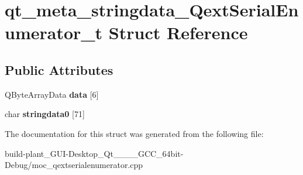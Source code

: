\hypertarget{structqt__meta__stringdata__QextSerialEnumerator__t}{}\section{qt\+\_\+meta\+\_\+stringdata\+\_\+\+Qext\+Serial\+Enumerator\+\_\+t Struct Reference}
\label{structqt__meta__stringdata__QextSerialEnumerator__t}
\subsection*{Public Attributes}
\begin{DoxyCompactItemize}
\item 
\mbox{\label{structqt__meta__stringdata__QextSerialEnumerator__t_a0c495525f0d472cd0b67572f343ff4a9}} 
Q\+Byte\+Array\+Data {\bfseries data} \mbox{[}6\mbox{]}
\item 
\mbox{\label{structqt__meta__stringdata__QextSerialEnumerator__t_a34e373d82c5f50ba7f12815a13d30f24}} 
char {\bfseries stringdata0} \mbox{[}71\mbox{]}
\end{DoxyCompactItemize}


The documentation for this struct was generated from the following file\+:\begin{DoxyCompactItemize}
\item 
build-\/plant\+\_\+\+G\+U\+I-\/\+Desktop\+\_\+\+Qt\+\_\+\_\+\_\+\_\+\+G\+C\+C\+\_\+64bit-\/\+Debug/moc\+\_\+qextserialenumerator.\+cpp\end{DoxyCompactItemize}

